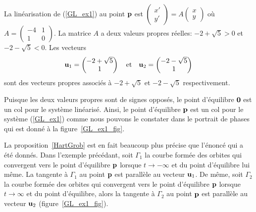 {\begin{egg}
La linéarisation de (\ref{GL_ex1}) au point $\mathbf{p}$ est
$\begin{pmatrix} x'\\ y' \end{pmatrix} = A
\begin{pmatrix} x\\ y \end{pmatrix}$ où
$\displaystyle A = \begin{pmatrix} -4 & 1 \\ 1 & 0 \end{pmatrix}$.
La matrice $A$ a deux valeurs propres réelles: $-2+\sqrt{5}>0$ et
$-2-\sqrt{5}<0$.  Les vecteurs
\[
\mathbf{u}_1 = \begin{pmatrix} -2+\sqrt{5} \\ 1 \end{pmatrix}
\quad \text{et} \quad
\mathbf{u}_2 = \begin{pmatrix} -2-\sqrt{5} \\ 1 \end{pmatrix}
\]
sont des vecteurs propres associés à $-2+\sqrt{5}$ et $-2-\sqrt{5}$
respectivement.

Puisque les deux valeurs propres sont de signes opposés, le point
d'équilibre $\mathbf{0}$ est un col pour le système linéarisé.  Ainsi,
le point d'équilibre $\mathbf{p}$ est un col pour le système
(\ref{GL_ex1}) comme nous pouvons le constater dans le portrait de phases
qui est donné à la figure~\ref{GL_ex1_fig}. 
\end{egg}


\begin{rmk}
La proposition~\ref{HartGrob} est en fait beaucoup plus précise que
l'énoncé qui a été donnés.
Dans l'exemple précédant, soit $\Gamma_1$ la courbe formée des orbites
qui convergent vers le point d'équilibre $\mathbf{p}$ lorsque
$t \to -\infty$ et du point d'équilibre lui
même.  La tangente à $\Gamma_1$ au point $\mathbf{p}$ est parallèle au
vecteur $\mathbf{u}_1$.  De même, soit $\Gamma_2$ la courbe formée des
orbites qui convergent vers le point d'équilibre $\mathbf{p}$ lorsque
$t\to \infty$ et du point d'équilibre, alors la tangente à $\Gamma_2$
au point $\mathbf{p}$ est parallèle au vecteur $\mathbf{u}_2$
(figure~\ref{GL_ex1_fig}).
\end{rmk}

}
